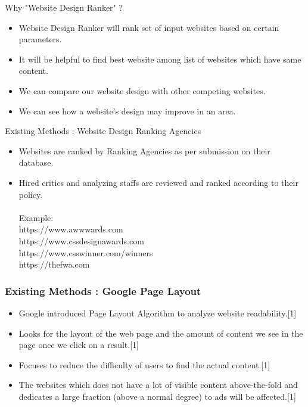 \documentclass[11pt]{beamer}
\begin{document}
	\begin{frame}{Why "Website Design Ranker" ?}
			\begin{itemize}
			\item Website Design Ranker will rank set of input websites based on certain parameters.
			\item It will be helpful to find best website among list of websites which have same content.
			\item We can compare our website design with other competing websites.
			\item We can see how a website's design may improve in an area.

			\end{itemize}
	\end{frame}
	\begin{frame}{Existing Methods : Website Design Ranking Agencies }
		\begin{itemize}
			\item Websites are ranked by Ranking Agencies as per submission on their database.
			\item Hired critics and analyzing staffs are reviewed and ranked according to their policy.
			\\\
			\\Example:\\
			https://www.awwwards.com\\

			https://www.cssdesignawards.com\\

			https://www.csswinner.com/winners\\

			https://thefwa.com\\
		\end{itemize}
	\end{frame}
	\begin{frame}
	\frametitle{{Existing Methods : Google Page Layout}}
	\begin{itemize}
		\item Google introduced Page Layout Algorithm to analyze website readability.[1]
		\item Looks for the layout of the web page and the amount of content we see in the page once we click on a result.[1]
		
		\item Focuses to reduce the difficulty of users to find the actual content.[1]
		
		\item  The websites which does not have a lot of visible content above-the-fold and dedicates a large fraction (above a normal degree) to ads will be affected.[1]
		
		
	\end{itemize}

	\end{frame}
\end{document}
